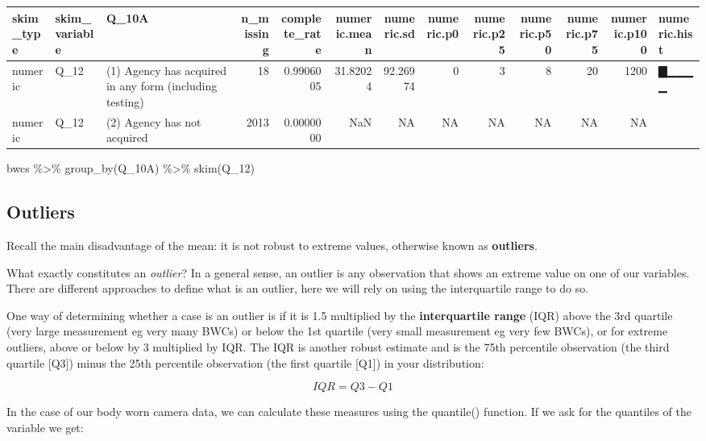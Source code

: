 \documentclass[
]{book}
\newenvironment{Shaded}{\begin{snugshade}}{\end{snugshade}}
\newcommand{\FunctionTok}[1]{\textcolor[rgb]{0.00,0.00,0.00}{#1}}
\newcommand{\NormalTok}[1]{#1}
\newcommand{\SpecialCharTok}[1]{\textcolor[rgb]{0.00,0.00,0.00}{#1}}
\begin{document}
\begin{tabular}{l|l|l|r|r|r|r|r|r|r|r|r|l}
\hline
skim\_type & skim\_variable & Q\_10A & n\_missing & complete\_rate & numeric.mean & numeric.sd & numeric.p0 & numeric.p25 & numeric.p50 & numeric.p75 & numeric.p100 & numeric.hist\\
\hline
numeric & Q\_12 & (1) Agency has acquired in any form (including testing) & 18 & 0.9906005 & 31.82024 & 92.26974 & 0 & 3 & 8 & 20 & 1200 & ▇▁▁▁▁\\
\hline
numeric & Q\_12 & (2) Agency has not acquired & 2013 & 0.0000000 & NaN & NA & NA & NA & NA & NA & NA & \\
\hline
\end{tabular}

\begin{Shaded}
\begin{Highlighting}[]
\NormalTok{bwcs }\SpecialCharTok{\%\textgreater{}\%} 
  \FunctionTok{group\_by}\NormalTok{(Q\_10A) }\SpecialCharTok{\%\textgreater{}\%} 
  \FunctionTok{skim}\NormalTok{(Q\_12)}
\end{Highlighting}
\end{Shaded}

\hypertarget{outliers}{%
\subsection{Outliers}\label{outliers}}

Recall the main disadvantage of the mean: it is not robust to extreme values, otherwise known as \textbf{outliers}.

What exactly constitutes an \emph{outlier}? In a general sense, an outlier is any observation that shows an extreme value on one of our variables. There are different approaches to define what is an outlier, here we will rely on using the interquartile range to do so.

One way of determining whether a case is an outlier is if it is 1.5 multiplied by the \textbf{interquartile range} (IQR) above the 3rd quartile (very large measurement eg very many BWCs) or below the 1st quartile (very small measurement eg very few BWCs), or for extreme outliers, above or below by 3 multiplied by IQR. The IQR is another robust estimate and is the 75th percentile observation (the third quartile {[}Q3{]}) minus the 25th percentile observation (the first quartile {[}Q1{]}) in your distribution:

\[ IQR= Q3 - Q1 \]

In the case of our body worn camera data, we can calculate these measures using the quantile() function. If we ask for the quantiles of the variable we get:
\end{document}

